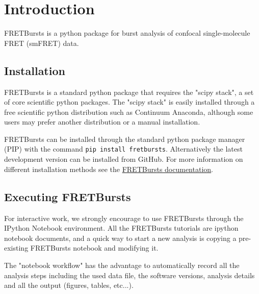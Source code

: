 \section{Introduction}

FRETBursts is a python package for burst analysis of confocal single-molecule FRET (smFRET) data.

\subsection{Installation}
FRETBursts is a standard python package that requires the "scipy stack", a set of core scientific python packages.
The "scipy stack" is easily installed through a free scientific python distribution such as Continuum Anaconda, although some users may prefer another distribution or a manual installation.

FRETBursts can be installed through the standard python package manager (PIP) with 
the command \verb|pip install fretbursts|. Alternatively the latest development version can be installed from GitHub.
For more information on different installation methods see the \href{http://fretbursts.readthedocs.org/installation.html#installation}{FRETBursts documentation}.

\subsection{Executing FRETBursts}
For interactive work, we strongly encourage to use FRETBursts through the IPython Notebook environment. All the FRETBursts tutorials are ipython notebook documents, and a quick way to start a new analysis is copying a pre-existing FRETBursts notebook and modifying it.

The "notebook workflow" has the advantage to automatically record all the analysis steps including the used data file, the software versions, analysis details and all the output (figures, tables, etc...).
